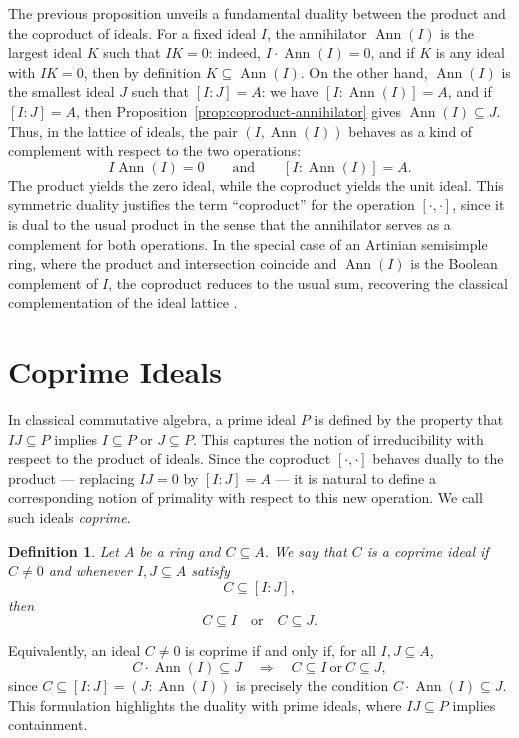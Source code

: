 \documentclass{amsart}
\newtheorem{definition}{Definition}
\DeclareMathOperator{\ann}{Ann}
\begin{document}
The previous proposition unveils a fundamental duality between the product and the coproduct of ideals. For a fixed ideal $I$, the annihilator $\ann(I)$ is the largest ideal $K$ such that $IK=0$: indeed, $I\cdot\ann(I)=0$, and if $K$ is any ideal with $IK=0$, then by definition $K\subseteq\ann(I)$. On the other hand, $\ann(I)$ is the smallest ideal $J$ such that $[I:J]=A$: we have $[I:\ann(I)]=A$, and if $[I:J]=A$, then Proposition~\ref{prop:coproduct-annihilator} gives $\ann(I)\subseteq J$. Thus, in the lattice of ideals, the pair $(I,\ann(I))$ behaves as a kind of complement with respect to the two operations:
\[
I\ann(I) = 0 \qquad \text{and} \qquad [I:\ann(I)] = A.
\]
The product yields the zero ideal, while the coproduct yields the unit ideal. This symmetric duality justifies the term ``coproduct'' for the operation $[\cdot,\cdot]$, since it is dual to the usual product in the sense that the annihilator serves as a complement for both operations. In the special case of an Artinian semisimple ring, where the product and intersection coincide and $\ann(I)$ is the Boolean complement of $I$, the coproduct reduces to the usual sum, recovering the classical complementation of the ideal lattice \cite{ChajdaLanger2019}.

\section{Coprime Ideals}
\label{sec:coprime-ideal}

In classical commutative algebra, a prime ideal $P$ is defined by the property that $IJ \subseteq P$ implies $I \subseteq P$ or $J \subseteq P$. This captures the notion of irreducibility with respect to the product of ideals. Since the coproduct $[\cdot,\cdot]$ behaves dually to the product --- replacing $IJ=0$ by $[I:J]=A$ --- it is natural to define a corresponding notion of primality with respect to this new operation. We call such ideals \emph{coprime}.

\begin{definition}\label{def:coprime}
Let $A$ be a ring and $C\subseteq A$. We say that $C$ is a \emph{coprime ideal} if $C\neq 0$ and whenever $I,J\subseteq A$ satisfy
\[
C \subseteq [I:J],
\]
then
\[
C \subseteq I \quad \text{or} \quad C \subseteq J.
\]
\end{definition}

Equivalently, an ideal $C\neq 0$ is coprime if and only if, for all $I,J\subseteq A$,
\[
C\cdot \ann(I) \subseteq J \quad \Longrightarrow \quad C\subseteq I \ \text{or} \ C\subseteq J,
\]
since $C\subseteq [I:J]=(J:\ann(I))$ is precisely the condition $C\cdot\ann(I)\subseteq J$. This formulation highlights the duality with prime ideals, where $IJ\subseteq P$ implies containment.
\end{document}
